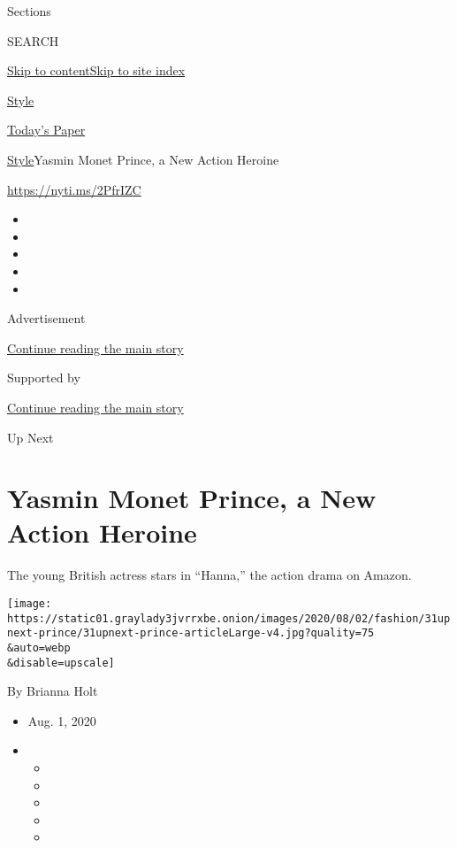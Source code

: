 Sections

SEARCH

\protect\hyperlink{site-content}{Skip to
content}\protect\hyperlink{site-index}{Skip to site index}

\href{https://www.nytimes3xbfgragh.onion/section/style}{Style}

\href{https://myaccount.nytimes3xbfgragh.onion/auth/login?response_type=cookie\&client_id=vi}{}

\href{https://www.nytimes3xbfgragh.onion/section/todayspaper}{Today's
Paper}

\href{/section/style}{Style}\textbar{}Yasmin Monet Prince, a New Action
Heroine

\url{https://nyti.ms/2PfrIZC}

\begin{itemize}
\item
\item
\item
\item
\item
\end{itemize}

Advertisement

\protect\hyperlink{after-top}{Continue reading the main story}

Supported by

\protect\hyperlink{after-sponsor}{Continue reading the main story}

Up Next

\hypertarget{yasmin-monet-prince-a-new-action-heroine}{%
\section{Yasmin Monet Prince, a New Action
Heroine}\label{yasmin-monet-prince-a-new-action-heroine}}

The young British actress stars in ``Hanna,'' the action drama on
Amazon.

\texttt{[image: https://static01.graylady3jvrrxbe.onion/images/2020/08/02/fashion/31upnext-prince/31upnext-prince-articleLarge-v4.jpg?quality=75\\\&auto=webp\\\&disable=upscale]}

By Brianna Holt

\begin{itemize}
\item
  Aug. 1, 2020
\item
  \begin{itemize}
  \item
  \item
  \item
  \item
  \item
  \end{itemize}
\end{itemize}

